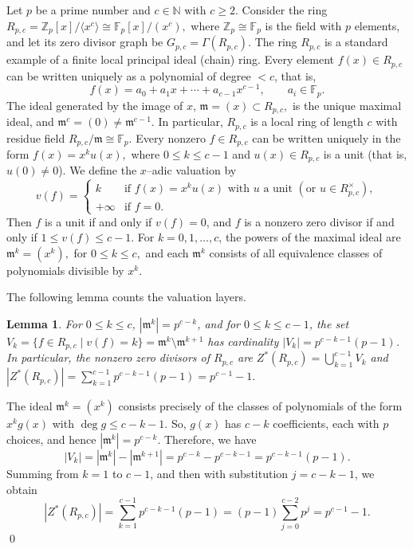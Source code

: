 \documentclass[12pt]{article}
\newtheorem{lemma}[theorem]{Lemma}
\theoremstyle{definition}
\renewenvironment{proof}{{\bf \noindent Proof.}}{\qed}
\begin{document}
\medskip
Let $p$ be a prime number and $c\in\mathbb N$ with $c\ge 2$.  Consider the ring $R_{p,c} = \mathbb Z_p[x]/\langle x^c\rangle \cong \mathbb F_p[x]/(x^c),$ where $\mathbb Z_p\cong\mathbb F_p$ is the field with $p$ elements, and let its zero divisor graph be $G_{p,c}=\Gamma(R_{p,c}).$  The ring $R_{p,c}$ is a standard example of a finite local principal ideal
(chain) ring.  Every element $f(x)\in R_{p,c}$ can be written uniquely as a polynomial of degree $<c$, that is,
\[
f(x) = a_0 + a_1 x + \cdots + a_{c-1}x^{c-1},\qquad a_i\in\mathbb F_p.
\]
The ideal generated by the image of $x$, $\mathfrak m = (x) \subset R_{p,c},$ 	is the unique maximal ideal, and $\mathfrak m^c=(0)\neq\mathfrak m^{c-1}$.  In	particular, $R_{p,c}$ is a local ring of length $c$ with residue field
$R_{p,c}/\mathfrak m\cong\mathbb F_p$.  Every nonzero $f\in R_{p,c}$ can be written uniquely in the form 	$f(x) = x^k u(x),$ where $0\le k\le c-1$ and $u(x)\in R_{p,c}$ is a unit (that is, $u(0)\ne 0$).  We
define the $x$--adic valuation by
\[
v(f) =
\begin{cases}
	k & \text{if } f(x)=x^k u(x)\text{ with }u\text{ a unit } (\text{or } u\in R_{p,c}^\times),\\[2pt]
	+\infty & \text{if }f=0.
\end{cases}
\]
Then $f$ is a unit if and only if $v(f)=0$, and $f$ is a nonzero zero divisor if and only if
$1\le v(f)\le c-1$.	For $k=0,1,\dots,c$, the powers of the maximal ideal are $\mathfrak m^k = (x^k),$ for $0\le k\le c,$	and each $\mathfrak m^k$ consists of all equivalence classes of polynomials 	divisible by $x^k$. 

\medskip
The following lemma counts the valuation layers.
\begin{lemma}\label{lem:pc-mk-revised}
	For $0\le k\le c$, $|\mathfrak m^k| = p^{c-k}$, and for $0\le k\le c-1$, the set $V_k = \{f\in R_{p,c} \mid v(f)=k\}
	= \mathfrak m^k\setminus \mathfrak m^{k+1}$ has cardinality	$|V_k| = p^{c-k-1}(p-1)$.  In particular, the nonzero zero divisors of $R_{p,c}$ are $Z^{*}(R_{p,c})
	= \bigcup_{k=1}^{c-1} V_k$ and $|Z^{*}(R_{p,c})|
	= \sum_{k=1}^{c-1} p^{c-k-1}(p-1)
	= p^{c-1}-1.$ 
\end{lemma}

\begin{proof}
	The ideal $\mathfrak m^k=(x^k)$ consists precisely of the classes of polynomials
	of the form $x^k g(x)$ with $\deg g\le c-k-1$. So, $g(x)$ has $c-k$ coefficients,	each with $p$ choices, and hence $|\mathfrak m^k|=p^{c-k}$.  Therefore, we have
	\[
	|V_k| = |\mathfrak m^k|-|\mathfrak m^{k+1}|
	= p^{c-k}-p^{c-k-1}
	= p^{c-k-1}(p-1).
	\]
	Summing from $k=1$ to $c-1$, and then with substitution $j=c-k-1$,  we obtain
	\[
	|Z^{*}(R_{p,c})|
	= \sum_{k=1}^{c-1} p^{c-k-1}(p-1)
	= (p-1)\sum_{j=0}^{c-2} p^j
	= p^{c-1}-1.
	\]
\end{proof}
\end{document}
